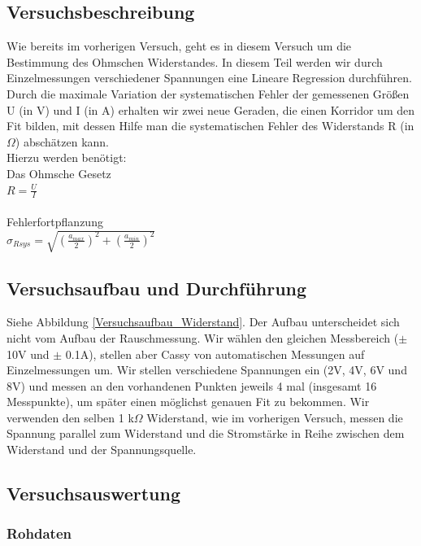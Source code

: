 \documentclass[12pt,a4paper]{article}
\begin{document}
\subsection{Versuchsbeschreibung}
Wie bereits im vorherigen Versuch, geht es in diesem Versuch um die Bestimmung des Ohmschen Widerstandes. In diesem Teil werden wir durch Einzelmessungen verschiedener Spannungen eine Lineare Regression durchführen. Durch die maximale Variation der systematischen Fehler der gemessenen Größen U (in V) und I (in A) erhalten wir zwei neue Geraden, die einen Korridor um den Fit bilden, mit dessen Hilfe man die systematischen Fehler des Widerstands R (in $\Omega$) abschätzen kann.\\
Hierzu werden benötigt:\\
Das Ohmsche Gesetz \\
$R = \frac{U}{I}$\\
\\
Fehlerfortpflanzung\\
$\sigma_{R sys} = \sqrt{(\frac{a_{max}}{2})^2+(\frac{a_{min}}{2})^2}$\\
\subsection{Versuchsaufbau und Durchführung}
Siehe Abbildung \ref{Versuchsaufbau_Widerstand}. \newline
Der Aufbau unterscheidet sich nicht vom Aufbau der Rauschmessung. Wir wählen den gleichen Messbereich ($\pm$ 10V und $\pm$ 0.1A), stellen aber Cassy von automatischen Messungen auf Einzelmessungen um. Wir stellen verschiedene Spannungen ein (2V, 4V, 6V und 8V) und messen an den vorhandenen Punkten jeweils 4 mal (insgesamt 16 Messpunkte), um später einen möglichst genauen Fit zu bekommen. Wir verwenden den selben 1 k$\Omega$ Widerstand, wie im vorherigen Versuch, messen die Spannung parallel zum Widerstand und die Stromstärke in Reihe zwischen dem Widerstand und der Spannungsquelle.\\
\subsection{Versuchsauswertung}
\subsubsection{Rohdaten}
\end{document}
